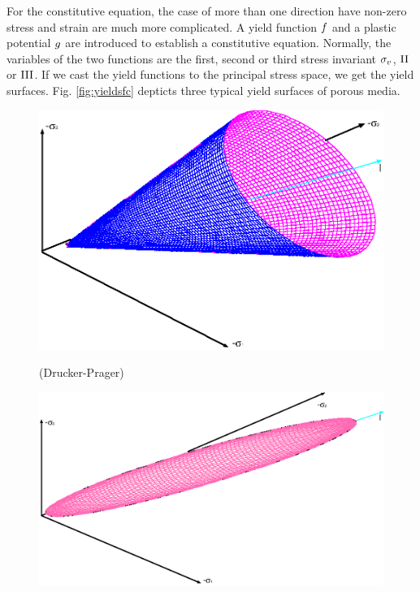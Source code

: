 For the constitutive equation, the case of more than one direction have non-zero stress and strain are much more complicated. A yield function $f$ and a plastic potential $g$ are introduced to establish a constitutive equation. Normally, the variables of the two functions are the first, second or third stress invariant $\sigma_{v}$, $\mathrm {II}$ or $\mathrm{III}$. If we cast the yield functions to the principal stress space, we get the yield surfaces. Fig. \ref{fig:yieldsfc} depticts three typical yield surfaces of porous media.

\begin{figure}[!htb]
  \begin{center}
   \begin{minipage}[t]{0.48\textwidth}
     \begin{center}
    \includegraphics[scale=0.28]{M/figure/yieldsfc_dp.eps}
    \centerline{(Drucker-Prager)}
    \end{center}
   \end{minipage}
   \hspace{0.02\textwidth}
   \begin{minipage}[t]{0.48\textwidth}
    \begin{center}
    \includegraphics[scale=0.28]{M/figure/yieldsfc_cam.eps}\\

\end{center}
\end{minipage}
\end{center}
\end{figure}
